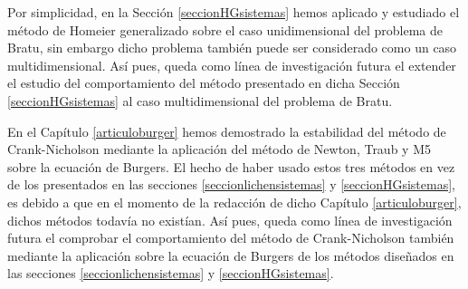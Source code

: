Por simplicidad, en la Sección \ref{seccionHGsistemas} hemos aplicado y estudiado el método de Homeier generalizado sobre el caso unidimensional del problema de Bratu, sin embargo dicho problema también puede ser considerado como un caso multidimensional. Así pues, queda como línea de investigación futura el extender el estudio del comportamiento del método presentado en dicha Sección \ref{seccionHGsistemas} al caso multidimensional del problema de Bratu.

En el Capítulo \ref{articuloburger} hemos demostrado la estabilidad del método de Crank-Nicholson mediante la aplicación del método de Newton, Traub y M5 sobre la ecuación de Burgers. El hecho de haber usado estos tres métodos en vez de los presentados en las secciones \ref{seccionlichensistemas} y \ref{seccionHGsistemas}, es debido a que en el momento de la redacción de dicho Capítulo \ref{articuloburger}, dichos métodos todavía no existían. Así pues, queda como línea de investigación futura el comprobar el comportamiento del método de Crank-Nicholson también mediante la aplicación sobre la ecuación de Burgers de los métodos diseñados en las secciones \ref{seccionlichensistemas} y \ref{seccionHGsistemas}.